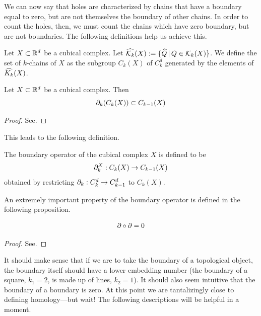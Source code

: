We can now say that holes are characterized by chains that have a boundary equal to zero, but are not themselves the boundary of other chains. In order to count the holes, then, we must count the chains which have zero boundary, but are not boundaries. The following definitions help us achieve this.

\begin{defn}
	Let $X \subset \mathbb{R}^d$ be a cubical complex. Let $\widehat{\mathcal{K}_k}(X) := \{ \widehat{Q} \, | \, Q \in \mathcal{K}_k(X) \}$. We define the set of $k$-chains of $X$ as the subgroup $C_k(X)$ of $C_k^d$ generated by the elements of $\widehat{K_k}(X)$.
\end{defn}

\begin{prop}
	Let $X \subset \mathbb{R}^d$ be a cubical complex. Then
	$$ \partial_k (C_k(X)) \subset C_{k-1}(X) $$
\end{prop}
%
\begin{proof}
	See.
\end{proof}

This leads to the following definition.

\begin{defn}
	The boundary operator of the cubical complex $X$ is defined to be
	$$ \partial_k^X : C_k(X) \rightarrow C_{k-1}(X) $$
	obtained by restricting $\partial_k : C_k^d \rightarrow C_{k-1}^d$ to $C_k(X)$.
\end{defn}

An extremely important property of the boundary operator is defined in the following proposition.

\begin{prop} \label{prop:bdofbd}
	$$\partial \circ \partial = 0$$
\end{prop}
%
\begin{proof}
	See.
\end{proof}

It should make sense that if we are to take the boundary of a topological object, the boundary itself should have a lower embedding number (the boundary of a square, $k_1=2$, is made up of lines, $k_2=1$). It should also seem intuitive that the boundary of a boundary is zero. At this point we are tantalizingly close to defining homology---but wait! The following descriptions will be helpful in a moment.

